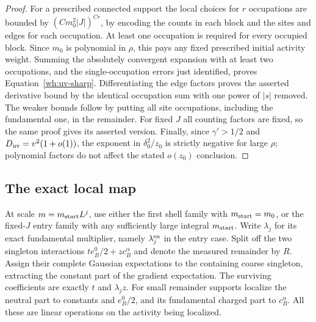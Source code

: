 \begin{proof}
For a prescribed connected support the local choices for $r$
occupations are bounded by $(Cm_0^2|J|)^{Cr}$, by encoding the counts
in each block and the sites and edges for each occupation.  At least
one occupation is required for every occupied block.  Since $m_0$ is
polynomial in $\rho$, this pays any fixed prescribed initial activity
weight.  Summing the absolutely convergent expansion with at least two
occupations, and the single-occupation errors just identified, proves
Equation~\eqref{wh:uv-sharp}.  Differentiating the edge factors proves
the asserted derivative bound by the identical occupation sum with
one power of $|s|$ removed.  The weaker bounds follow by putting all
site occupations, including the fundamental one, in the remainder.
For fixed $J$ all counting factors are fixed, so the same proof gives
its asserted version.  Finally, since $\gamma'>1/2$ and
$D_{\rm uv}=v^2(1+o(1))$, the exponent in $\delta_0^2/z_0$ is
strictly negative for large $\rho$; polynomial factors do not affect
the stated $o(z_0)$ conclusion.
\end{proof}

\subsection{The exact local map}

At scale $m=m_{\rm start}L^j$, use either the first shell family
with $m_{\rm start}=m_0$, or the fixed-$J$ entry family with any
sufficiently large integral $m_{\rm start}$.  Write $\lambda_j$ for
its exact fundamental multiplier, namely $\lambda_j^{\rm en}$ in the
entry case.  Split off the two singleton interactions
$t e_B^0/2+zc_B^\alpha$ and denote the measured remainder by $R$.
Assign their complete Gaussian expectations to the containing coarse
singleton, extracting the constant part of the gradient expectation.
The surviving coefficients are exactly $t$ and $\lambda_jz$.
For small remainder supports localize the neutral part to constants
and $e_B^0/2$, and its fundamental charged part to $c_B^\alpha$.
All these are linear operations on the activity being localized.

